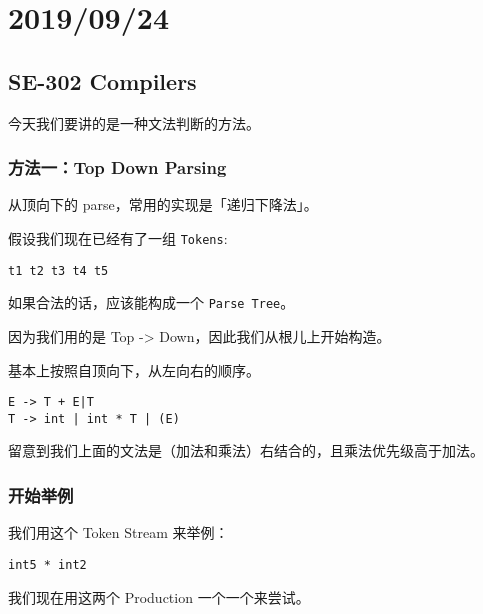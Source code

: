 \documentclass[
]{article}
\date{}
\begin{document}
\hypertarget{header-n0}{%
\section{2019/09/24}\label{header-n0}}

\hypertarget{header-n2}{%
\subsection{SE-302 Compilers}\label{header-n2}}

今天我们要讲的是一种文法判断的方法。

\hypertarget{header-n4}{%
\subsubsection{方法一：Top Down Parsing}\label{header-n4}}

从顶向下的 parse，常用的实现是「递归下降法」。

假设我们现在已经有了一组 \texttt{Tokens}:

\begin{verbatim}
t1 t2 t3 t4 t5
\end{verbatim}

如果合法的话，应该能构成一个 \texttt{Parse\ Tree}。

因为我们用的是 Top -\textgreater{} Down，因此我们从根儿上开始构造。

基本上按照自顶向下，从左向右的顺序。

\begin{verbatim}
E -> T + E|T
T -> int | int * T | (E)
\end{verbatim}

留意到我们上面的文法是（加法和乘法）右结合的，且乘法优先级高于加法。

\hypertarget{header-n13}{%
\subsubsection{开始举例}\label{header-n13}}

我们用这个 Token Stream 来举例：

\begin{verbatim}
int5 * int2
\end{verbatim}

我们现在用这两个 Production 一个一个来尝试。
\end{document}
